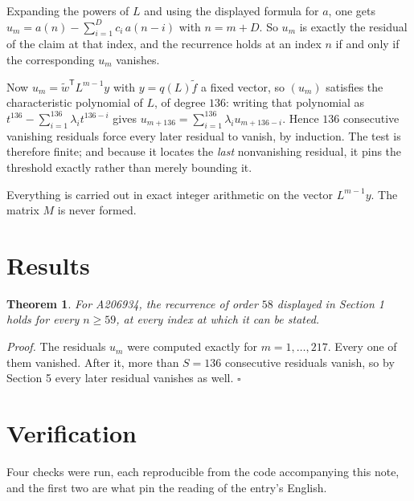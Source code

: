 \documentclass[11pt]{article}
\newtheorem{theorem}{Theorem}
\theoremstyle{definition}
\begin{document}
Expanding the powers of $L$ and using the displayed formula for $a$, one gets $u_m = a(n) - \sum_{i=1}^{D} c_i\,a(n-i)$ with $n = m + D$. So $u_m$ is exactly the residual of the claim at that index, and the recurrence holds at an index $n$ if and only if the corresponding $u_m$ vanishes.

Now $u_m = \tilde w^{\mathsf T} L^{m-1} y$ with $y = q(L)\tilde f$ a fixed vector, so $(u_m)$ satisfies the characteristic polynomial of $L$, of degree $136$: writing that polynomial as $t^{136} - \sum_{i=1}^{136} \lambda_i t^{136-i}$ gives $u_{m+136} = \sum_{i=1}^{136} \lambda_i u_{m+136-i}$. Hence $136$ consecutive vanishing residuals force every later residual to vanish, by induction. The test is therefore finite; and because it locates the {\itshape last} nonvanishing residual, it pins the threshold exactly rather than merely bounding it.

Everything is carried out in exact integer arithmetic on the vector $L^{m-1}y$. The matrix $M$ is never formed.

\section{Results}

\begin{theorem} For A206934, the recurrence of order $58$ displayed in Section 1 holds for every $n \ge 59$, at every index at which it can be stated.\end{theorem}

{\itshape Proof.} The residuals $u_m$ were computed exactly for $m = 1,\dots,217$. Every one of them vanished. After it, more than $S = 136$ consecutive residuals vanish, so by Section 5 every later residual vanishes as well. $\square$

\section{Verification}

Four checks were run, each reproducible from the code accompanying this note, and the first two are what pin the reading of the entry's English.
\end{document}
